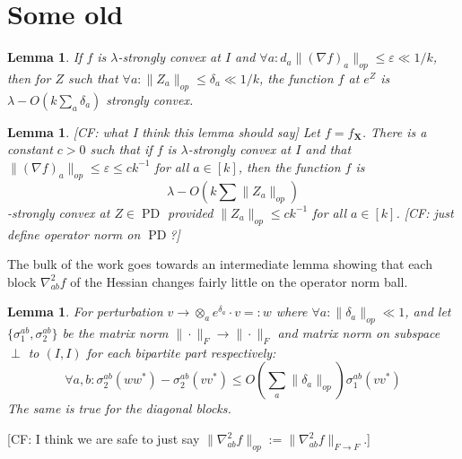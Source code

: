 \documentclass{article}
\newtheorem{lemma}[theorem]{Lemma}
\renewcommand{\vec}{\bm}
\newcommand\eps{\varepsilon}
\newcommand\PD{\operatorname{PD}}
\newcommand{\CF}[1]{{\color{purple}[CF: #1]}}
\begin{document}
\section{Some old}

\begin{lemma}\label{lem:perturbation-old}
If $f$ is $\lambda$-strongly convex at $I$ and $\forall a: d_{a} \|(\nabla f)_{a}\|_{op} \leq \eps \ll 1/k$, then for $Z$ such that $\forall a: \|Z_{a}\|_{op} \leq \delta_{a} \ll 1/k$, the function $f$ at $e^{Z}$ is $\lambda - O(k \sum_{a} \delta_{a})$ strongly convex.
\end{lemma}

\begin{lemma}\label{lem:perturbation} \CF{what I think this lemma should say} Let $f = f_{\vec X}$. There is a constant $c > 0$ such that if $f$ is $\lambda$-strongly convex at $I$ and that $\|(\nabla f)_{a}\|_{op} \leq \eps \leq c k ^{-1}$ for all $ a \in [k]$, then the function $f$ is 
$$ \lambda - O(k \sum \|Z_a\|_{op})$$
-strongly convex at $Z \in \PD$ provided $\|Z_a\|_{op} \leq c k^{-1}$ for all $a \in [k]$. \CF{just define operator norm on $\PD$?}

\end{lemma}




The bulk of the work goes towards an intermediate lemma showing that each block $\nabla^2_{ab} f$ of the Hessian changes fairly little on the operator norm ball.


\begin{lemma}\label{lem:block-perturbation-old}
For perturbation $v \to \otimes_{a} e^{\delta_{a}} \cdot v =: w$ where $\forall a: \|\delta_{a}\|_{op} \ll 1$, and let $\{\sigma_{1}^{ab}, \sigma_{2}^{ab}\}$ be the matrix norm $\|\cdot\|_{F} \to \|\cdot\|_{F}$ and matrix norm on subspace $\perp$ to $(I,I)$ for each bipartite part respectively:
\[ \forall a,b: \sigma_{2}^{ab}(w w^{*}) - \sigma_{2}^{ab}(v v^{*}) \leq O \left( \sum_{a} \|\delta_{a}\|_{op}  \right) \sigma_{1}^{ab}(v v^{*})   \]
The same is true for the diagonal blocks.
\end{lemma}

\CF{I think we are safe to just say $\|\nabla^2_{ab}f\|_{op}:=\|\nabla^2_{ab}f\|_{F\to F}$.}
\end{document}
